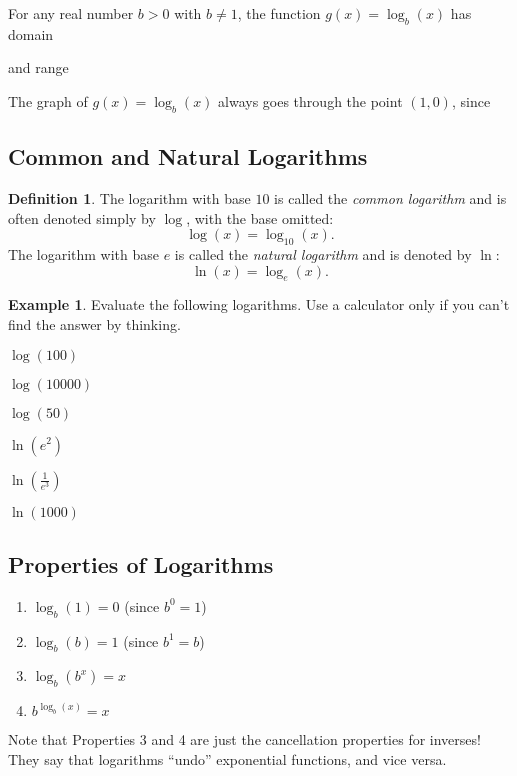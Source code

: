 \documentclass[letterpaper,12pt,oneside]{book}
\theoremstyle{definition}
\newtheorem{definition}[theorem]{Definition}
\newtheorem{example}[theorem]{Example}
\newcommand{\dsp}{\displaystyle}
\begin{document}
{\noindent
For any real number $b>0$ with $b\neq 1$, the function $g(x)=\log_b(x)$ has domain

\vfill

\noindent
and range

\vfill

\noindent
The graph of $g(x)=\log_b(x)$ always goes through the point $(1,0)$, since

\newpage

\subsection*{Common and Natural Logarithms}

\begin{definition}
The logarithm with base $10$ is called the \emph{common logarithm} and is often denoted simply by $\log$, with the base omitted:
\[
\log(x)=\log_{10}(x).
\]
The logarithm with base $e$ is called the \emph{natural logarithm} and is denoted by $\ln$:
\[
\ln(x)=\log_e(x).
\]
\end{definition}

\begin{example}
Evaluate the following logarithms.  Use a calculator only if you can't find the answer by thinking.
\begin{enumerate}
\begin{multicols}{2}
\item $\log(100)$
\vspace{0.2cm}
\item $\log(10000)$
\vspace{0.2cm}
\item $\log(50)$
\vspace{0.2cm}
\item $\ln(e^2)$
\vspace{0.2cm}
\item $\ln\left(\tfrac{1}{e^3}\right)$
\vspace{0.2cm}
\item $\ln(1000)$
\vspace{0.2cm}
\end{multicols}
\end{enumerate}
\end{example}

\subsection*{Properties of Logarithms}

\begin{multicols}{2}
\begin{enumerate}[label=\arabic*.]
\item $\dsp \log_b(1)=0$ (since $b^0=1$)
\item $\dsp \log_b(b)=1$ (since $b^1=b$)
\item $\dsp\log_b(b^x)=x$
\item $\dsp b^{\log_b(x)}=x$
\end{enumerate}
\end{multicols}
\noindent
Note that Properties 3 and 4 are just the cancellation properties for inverses!  They say that logarithms ``undo'' exponential functions, and vice versa.

}
\end{document}
